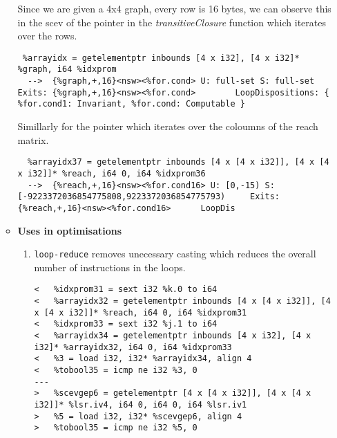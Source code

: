 \documentclass[12pt]{article}
\begin{document}
\begin{enumerate}
\begin{itemize}
Since we are given a 4x4 graph, every row is 16 bytes, we can observe this in the scev of the pointer in the \textit{transitiveClosure} function which iterates over the rows.
\begin{lstlisting}
 %arrayidx = getelementptr inbounds [4 x i32], [4 x i32]* %graph, i64 %idxprom
  -->  {%graph,+,16}<nsw><%for.cond> U: full-set S: full-set		Exits: {%graph,+,16}<nsw><%for.cond>		LoopDispositions: { %for.cond1: Invariant, %for.cond: Computable }
\end{lstlisting}
Simillarly for the pointer which iterates over the coloumns of the reach matrix.\\
\begin{lstlisting}
  %arrayidx37 = getelementptr inbounds [4 x [4 x i32]], [4 x [4 x i32]]* %reach, i64 0, i64 %idxprom36
  -->  {%reach,+,16}<nsw><%for.cond16> U: [0,-15) S: [-9223372036854775808,9223372036854775793)		Exits: {%reach,+,16}<nsw><%for.cond16>		LoopDis
\end{lstlisting}
\item \textbf{Uses in optimisations}
\begin{enumerate}
\item \texttt{loop-reduce} removes unecessary casting which reduces the overall number of instructions in the loops.
\begin{lstlisting}
<   %idxprom31 = sext i32 %k.0 to i64
<   %arrayidx32 = getelementptr inbounds [4 x [4 x i32]], [4 x [4 x i32]]* %reach, i64 0, i64 %idxprom31
<   %idxprom33 = sext i32 %j.1 to i64
<   %arrayidx34 = getelementptr inbounds [4 x i32], [4 x i32]* %arrayidx32, i64 0, i64 %idxprom33
<   %3 = load i32, i32* %arrayidx34, align 4
<   %tobool35 = icmp ne i32 %3, 0
---
>   %scevgep6 = getelementptr [4 x [4 x i32]], [4 x [4 x i32]]* %lsr.iv4, i64 0, i64 0, i64 %lsr.iv1
>   %5 = load i32, i32* %scevgep6, align 4
>   %tobool35 = icmp ne i32 %5, 0

\end{lstlisting}
\end{enumerate}
\end{itemize}
\end{enumerate}
\end{document}

